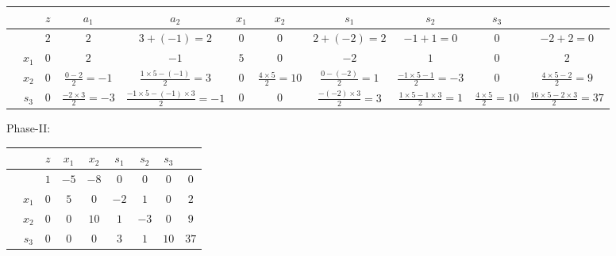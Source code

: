 \documentclass[a4paper,12pt]{article}
\begin{document}
\begin{table}[H]
    \tiny
    \begin{tabularx}{\textwidth}{cc|cccccccc|c}
         &       & $z$ & $a_1$                         & $a_2$                                        & $x_1$ & $x_2$                       & $s_1$                           & $s_2$                                   & $s_3$                       &                                           \\
        \hline
         &       & $2$ & $2$                           & $3 + (-1) = 2$                               & $0$   & $0$                         & $2 + (-2) = 2$                  & $-1 + 1 = 0$                            & $0$                         & $-2 + 2 = 0$                              \\
        \hline
         & $x_1$ & $0$ & $2$                           & $-1$                                         & $5$   & $0$                         & $-2$                            & $1$                                     & $0$                         & $2$                                       \\
         & $x_2$ & $0$ & $\frac{0 - 2}{2} = -1$        & $\frac{1 \times 5 - (-1)}{2} = 3$            & $0$   & $\frac{4 \times 5}{2} = 10$ & $\frac{0 - (-2)}{2} = 1$        & $\frac{-1 \times 5 - 1}{2} = -3$        & $0$                         & $\frac{4 \times 5 - 2}{2} = 9$            \\
         & $s_3$ & $0$ & $\frac{- 2 \times 3}{2} = -3$ & $\frac{-1 \times 5 - (-1) \times 3}{2} = -1$ & $0$   & $0$                         & $\frac{- (-2) \times 3}{2} = 3$ & $\frac{1 \times 5 - 1 \times 3}{2} = 1$ & $\frac{4 \times 5}{2} = 10$ & $\frac{16 \times 5 - 2 \times 3}{2} = 37$ \\
    \end{tabularx}
\end{table}

Phase-II:
\begin{table}[H]
    \tiny
    \begin{tabularx}{\textwidth}{cc|cccccc|c}
         &       & $z$ & $x_1$ & $x_2$ & $s_1$ & $s_2$ & $s_3$ &      \\
        \hline
         &       & $1$ & $-5$  & $-8$  & $0$   & $0$   & $0$   & $0$  \\
        \hline
         & $x_1$ & $0$ & $5$   & $0$   & $-2$  & $1$   & $0$   & $2$  \\
         & $x_2$ & $0$ & $0$   & $10$  & $1$   & $-3$  & $0$   & $9$  \\
         & $s_3$ & $0$ & $0$   & $0$   & $3$   & $1$   & $10$  & $37$ \\
    \end{tabularx}
\end{table}
\end{document}
